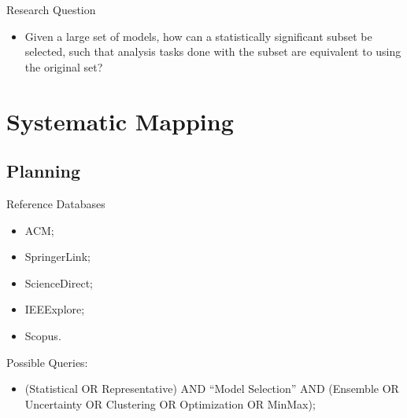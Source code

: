\documentclass{beamer}
\begin{document}
\begin{frame}{Research Question}
  \begin{itemize}
    \item Given a large set of models, how can a statistically significant subset be selected, such that analysis tasks done with the subset are equivalent to using the original set?
  \end{itemize}
\end{frame}

\section{Systematic Mapping}
\begin{frame}
  \tableofcontents[currentsection]
\end{frame}

\subsection{Planning}
\begin{frame}{Reference Databases}
  \begin{itemize}
  \item ACM;
  \item SpringerLink;
  \item ScienceDirect;
  \item IEEExplore;
  \item Scopus.
  \end{itemize}
\end{frame}

\begin{frame}
  Possible Queries:
  \begin{itemize}
    \item (Statistical OR Representative) AND ``Model Selection'' AND (Ensemble OR Uncertainty OR Clustering OR Optimization OR MinMax);
  \end{itemize}
\end{frame}
\end{document}
